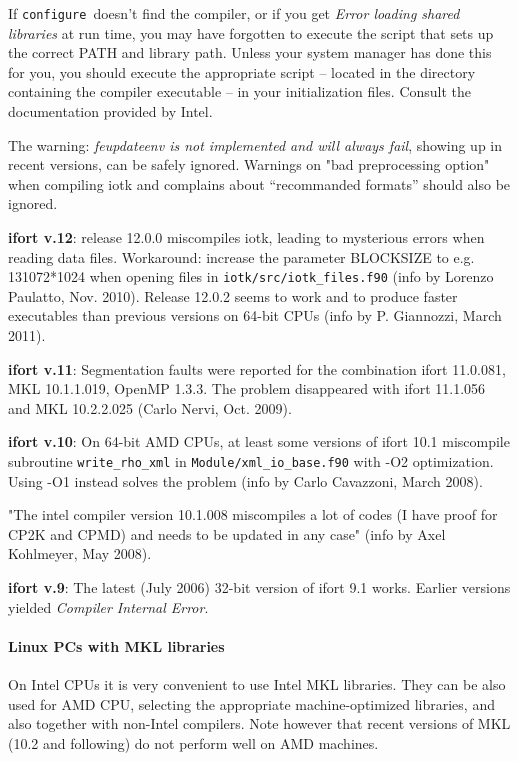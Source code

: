 \documentclass[12pt,a4paper]{article}
\def\configure{\texttt{configure}}
\begin{document}
If \configure\ doesn't find the compiler, or if you get 
{\em Error loading shared libraries} at run time, you may have 
forgotten to execute the script that
sets up the correct PATH and library path. Unless your system manager has
done this for you, you should execute the appropriate script -- located in
the directory containing the compiler executable -- in your
initialization files. Consult the documentation provided by Intel. 
    
The warning: {\em feupdateenv is not implemented and will always fail}, 
showing up in recent versions, can be safely ignored. Warnings on
"bad preprocessing option" when compiling iotk
and complains about ``recommanded formats''
should also be ignored.

{\bf ifort v.12}: release 12.0.0 miscompiles iotk, leading to 
mysterious errors when reading data files. Workaround: increase 
the parameter BLOCKSIZE to e.g. 131072*1024 when opening files in 
\texttt{iotk/src/iotk\_files.f90} (info by Lorenzo Paulatto,
Nov. 2010). Release 12.0.2 seems to work and to produce faster executables
than previous versions on 64-bit CPUs (info by P. Giannozzi, March 2011).

{\bf ifort v.11}: Segmentation faults were reported for the combination 
ifort 11.0.081, MKL 10.1.1.019, OpenMP 1.3.3. The problem disappeared
with ifort 11.1.056 and MKL 10.2.2.025 (Carlo Nervi, Oct. 2009).

{\bf ifort v.10}: On 64-bit AMD CPUs, at least some versions of ifort 10.1 
miscompile subroutine \texttt{write\_rho\_xml} in 
\texttt{Module/xml\_io\_base.f90} with -O2
optimization. Using -O1 instead solves the problem (info by Carlo
Cavazzoni, March 2008). 

"The intel compiler version 10.1.008 miscompiles a lot of codes (I have proof 
for CP2K and CPMD) and needs to be updated in any case" (info by Axel
Kohlmeyer, May 2008).
 
{\bf ifort v.9}: The latest (July 2006) 32-bit version of ifort 9.1
works. Earlier versions yielded {\em Compiler Internal Error}.
    
\paragraph{Linux PCs with MKL libraries}
On Intel CPUs it is very convenient to use Intel MKL libraries. They can be
also used for AMD CPU, selecting the appropriate machine-optimized
libraries, and also together with non-Intel compilers. Note however
that recent versions of MKL (10.2 and following) do not perform
well on AMD machines.
\end{document}
